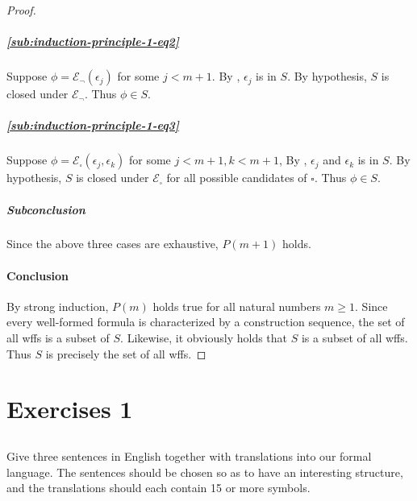 \documentclass{report}
\begin{document}
\begin{proof}
      \subparagraph{\eqref{sub:induction-principle-1-eq2}}%

        Suppose $\phi = \mathcal{E}_\neg(\epsilon_j)$ for some $j < m + 1$.
        By , $\epsilon_j$ is in $S$.
        By hypothesis, $S$ is closed under $\mathcal{E}_\neg$.
        Thus $\phi \in S$.

      \subparagraph{\eqref{sub:induction-principle-1-eq3}}%

        Suppose $\phi = \mathcal{E}_\square(\epsilon_j, \epsilon_k)$ for some
          $j < m + 1, k < m + 1$,
        By , $\epsilon_j$ and $\epsilon_k$
          is in $S$.
        By hypothesis, $S$ is closed under $\mathcal{E}_\square$ for all
          possible candidates of $\square$.
        Thus $\phi \in S$.

      \subparagraph{Subconclusion}%

        Since the above three cases are exhaustive, $P(m + 1)$ holds.

    \paragraph{Conclusion}%

      By strong induction, $P(m)$ holds true for all natural numbers $m \geq 1$.
      Since every well-formed formula is characterized by a construction
        sequence, the set of all wffs is a subset of $S$.
      Likewise, it obviously holds that $S$ is a subset of all wffs.
      Thus $S$ is precisely the set of all wffs.

  \end{proof}

\section{Exercises 1}%

\subsection{}%

  Give three sentences in English together with translations into our formal
    language.
  The sentences should be chosen so as to have an interesting structure, and the
    translations should each contain 15 or more symbols.
\end{document}
